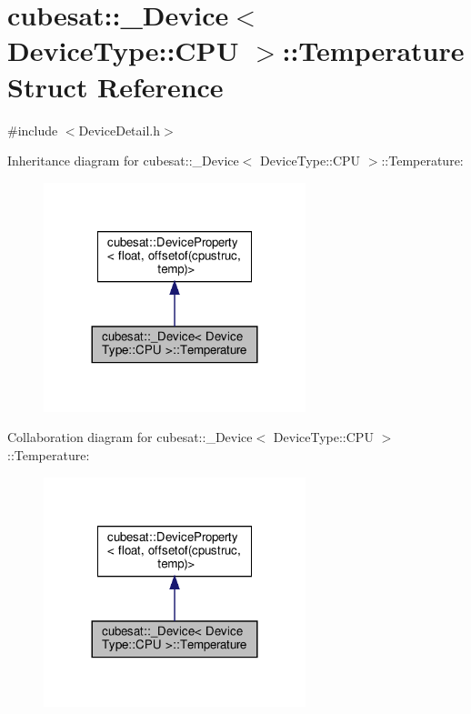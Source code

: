 \hypertarget{structcubesat_1_1__Device_3_01DeviceType_1_1CPU_01_4_1_1Temperature}{}\section{cubesat\+:\+:\+\_\+\+Device$<$ Device\+Type\+:\+:C\+PU $>$\+:\+:Temperature Struct Reference}
\label{structcubesat_1_1__Device_3_01DeviceType_1_1CPU_01_4_1_1Temperature}


{\ttfamily \#include $<$Device\+Detail.\+h$>$}



Inheritance diagram for cubesat\+:\+:\+\_\+\+Device$<$ Device\+Type\+:\+:C\+PU $>$\+:\+:Temperature\+:\nopagebreak
\begin{figure}[H]
\begin{center}
\leavevmode
\includegraphics[width=216pt]{structcubesat_1_1__Device_3_01DeviceType_1_1CPU_01_4_1_1Temperature__inherit__graph}
\end{center}
\end{figure}


Collaboration diagram for cubesat\+:\+:\+\_\+\+Device$<$ Device\+Type\+:\+:C\+PU $>$\+:\+:Temperature\+:\nopagebreak
\begin{figure}[H]
\begin{center}
\leavevmode
\includegraphics[width=216pt]{structcubesat_1_1__Device_3_01DeviceType_1_1CPU_01_4_1_1Temperature__coll__graph}
\end{center}
\end{figure}
